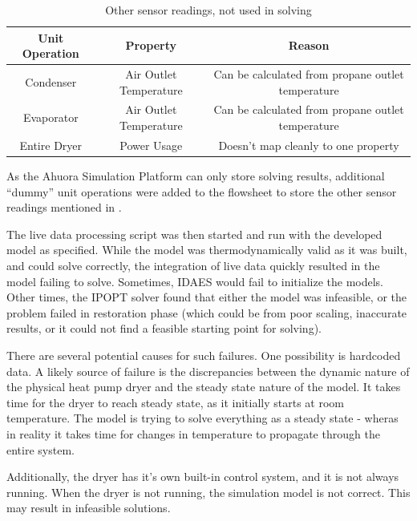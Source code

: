 \begin{table}[htbp]
    \centering
    \caption{Other sensor readings, not used in solving}
    \label{tab:liveprops}
    \begin{tabular}{|c|c|c|}
        \hline
            \textbf{Unit Operation} & \textbf{Property} & \textbf{Reason} \\
            \hline
            Condenser & Air Outlet Temperature & Can be calculated from propane outlet temperature \\
            Evaporator & Air Outlet Temperature & Can be calculated from propane outlet temperature \\
            Entire Dryer & Power Usage & Doesn't map cleanly to one property \\
        \hline
    \end{tabular}
\end{table}

As the Ahuora Simulation Platform can only store solving results, additional ``dummy'' unit operations were added to the flowsheet to store the other sensor readings mentioned in .

The live data processing script was then started and run with the developed model as specified.
While the model was thermodynamically valid as it was built, and could solve correctly, the integration of live data quickly resulted in the model failing to solve.
Sometimes, IDAES would fail to initialize the models. Other times, the IPOPT solver found that either the model was infeasible, or the problem failed in restoration phase (which could be from poor scaling, inaccurate results, or it could not find a feasible starting point for solving).


There are several potential causes for such failures. One possibility is hardcoded data. A likely source of failure is the discrepancies between the dynamic nature of the physical heat pump dryer and the steady state nature of the model. It takes time for the dryer to reach steady state, as it initially starts at room temperature. The model is trying to solve everything as a steady state - wheras in reality it takes time for changes in temperature to propagate through the entire system. 

Additionally, the dryer has it's own built-in control system, and it is not always running. When the dryer is not running, the simulation model is not correct. This may result in infeasible solutions. 



